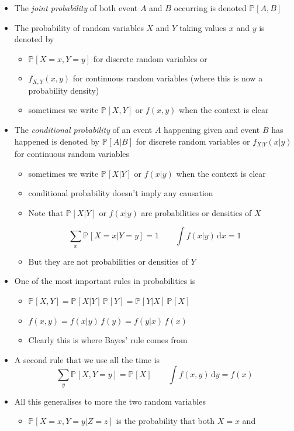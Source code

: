 \documentclass[11pt]{article}
\newcommand{\Prob}[2][]{\mathbb{P}_{#1\!}\left[ #2 \right]}
\newcommand{\dd}{\mathrm{d}}
\begin{document}
\begin{itemize}
\begin{itemize}
\item The \emph{joint probability} of both event \(A\) and \(B\) occurring is
denoted \(\Prob{A,B}\)
\item The probability of random variables \(X\) and \(Y\) taking values
\(x\) and \(y\) is denoted by
\begin{itemize}
\item \(\Prob{X=x,Y=y}\) for discrete random variables or
\item \(f_{X,Y}(x,y)\) for continuous random variables (where this
is now a probability density)
\item sometimes we write \(\Prob{X,Y}\) or \(f(x,y)\) when the context
is clear
\end{itemize}
\item The \emph{conditional probability} of an event \(A\) happening given
and event \(B\) has happened is denoted by \(\Prob{A|B}\) for
discrete random variables or \(f_{X|Y}(x|y)\) for continuous random
variables
\begin{itemize}
\item sometimes we write \(\Prob{X|Y}\) or \(f(x|y)\) when the context
is clear
\item conditional probability doesn't imply any causation
\item Note that \(\Prob{X|Y}\) or \(f(x|y)\) are probabilities or
densities of \(X\)
\end{itemize}
$$ \sum_x \Prob{X=x|Y=y} = 1 \quad \quad \int f(x|y) \, \dd x
        = 1 $$
\begin{itemize}
\item But they are not probabilities or densities of \(Y\)
\end{itemize}
\item One of the most important rules in probabilities  is
\begin{itemize}
\item \(\Prob{X,Y} = \Prob{X|Y}\,\Prob{Y} = \Prob{Y|X}\,\Prob{X}\)
\item \(f(x,y) = f(x|y)\,f(y) = f(y|x)\,f(x)\)
\item Clearly this is where Bayes' rule comes from
\end{itemize}
\item A second rule that we use all the time is
$$ \sum_y \Prob{X,Y=y} = \Prob{X} \quad\quad \int f(x,y) \, \dd y
        = f(x) $$
\item All this generalises to more the two random variables
\begin{itemize}
\item \(\Prob{X=x,Y=y|Z=z}\) is the probability that both \(X=x\) and

\end{itemize}
\end{itemize}
\end{itemize}
\end{document}
